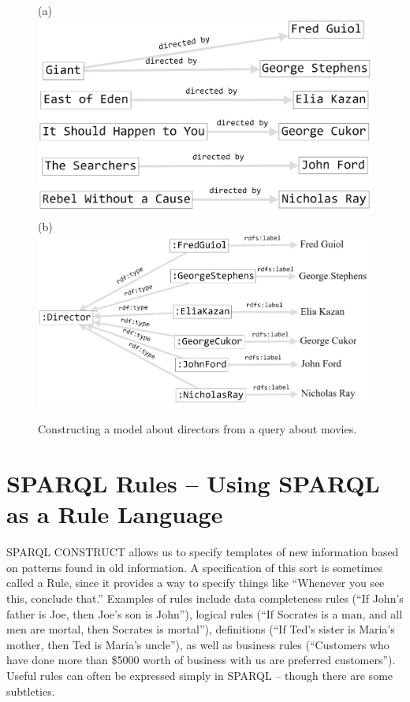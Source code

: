 \begin{figure}
\centering
(a)
\includegraphics[width=5in]{SWWOv3/media/ch6/figure6-8a.png}
(b)
\includegraphics[width=5in]{SWWOv3/media/ch6/figure6-8b.png}
\caption{Constructing a model about directors from a query about movies.}
\label{fig:ch6.8}
\end{figure}



\section{SPARQL Rules -- Using SPARQL as a Rule Language}

SPARQL CONSTRUCT allows us to specify templates of new information based
on patterns found in old information. A specification of this sort is
sometimes called a Rule, since it provides a way to specify things like
``Whenever you see this, conclude that.'' Examples of rules include data
completeness rules (``If John's father is Joe, then Joe's son is
John''), logical rules (``If Socrates is a man, and all men are mortal,
then Socrates is mortal''), definitions (``If Ted's sister is Maria's
mother, then Ted is Maria's uncle''), as well as business rules
(``Customers who have done more than \$5000
worth of business with us are preferred customers''). Useful rules can
often be expressed simply in 
SPARQL -- though there are some subtleties.

